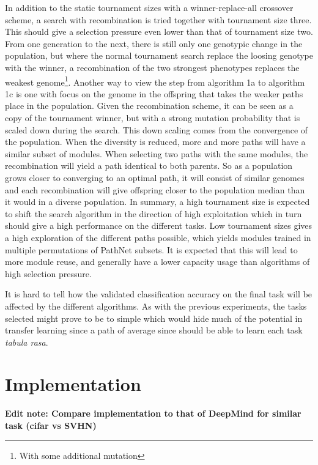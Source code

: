 In addition to the static tournament sizes with a winner-replace-all crossover scheme, a search with recombination is tried together with tournament size three.  This should give a selection pressure even lower than that of tournament size two. From one generation to the next, there is still only one genotypic change in the population, but where the normal tournament search replace the loosing genotype with the winner, a recombination of the two strongest phenotypes replaces the weakest genome\footnote{With some additional mutation}.  Another way to view the step from algorithm 1a to algorithm 1c is one with focus on the genome in the offspring that takes the weaker paths place in the population. Given the recombination scheme, it can be seen as a copy of the tournament winner, but with a strong mutation probability that is scaled down during the search. This down scaling comes from the convergence of the population. When the diversity is reduced, more and more paths will have a similar subset of modules. When selecting two paths with the same modules, the recombination will yield a path identical to both parents. So as a population grows closer to converging to an optimal path, it will consist of similar genomes and each recombination will give offspring closer to the population median than it would in a diverse population. 
In summary, a high tournament size is expected to shift the search algorithm in the direction of high exploitation which in turn should give a high performance on the different tasks. Low tournament sizes gives a high exploration of the different paths possible, which yields modules trained in multiple permutations of PathNet subsets. It is expected that this will lead to more module reuse, and generally have a lower capacity usage than algorithms of high selection pressure. 

It is hard to tell how the validated classification accuracy on the final task will be affected by the different algorithms. As with the previous experiments, the tasks selected might prove to be to simple which would hide much of the potential in transfer learning since a path of average since should be able to learn each task \textit{tabula rasa}.

\section{Implementation}\label{exp2:implementation}

\textbf{Edit note: Compare implementation to that of DeepMind for similar task (cifar vs SVHN)}

